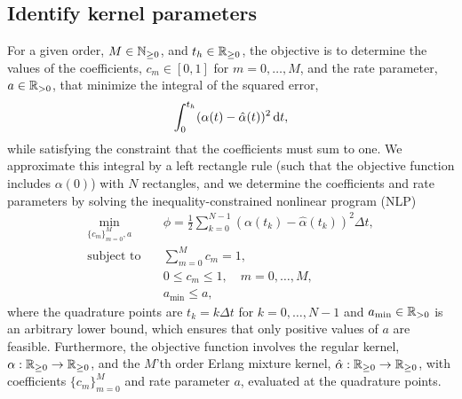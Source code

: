 \subsection{Identify kernel parameters}\label{sec:algo:least:squares}
For a given order, $M \in \mathbb{N}_{\geq 0}$, and $t_h \in \mathbb{R}_{\geq 0}$, the objective is to determine the values of the coefficients, $c_m \in [0, 1]$ for $m = 0, \ldots, M$, and the rate parameter, $a \in \mathbb{R}_{> 0}$, that minimize the integral of the squared error,
%
\begin{align}
	\int_0^{t_h} (\alpha(t) - \hat \alpha(t))^2 \,\mathrm{d} t,
\end{align}
%
while satisfying the constraint that the coefficients must sum to one. We approximate this integral by a left rectangle rule (such that the objective function includes $\alpha(0)$) with $N$ rectangles, and we determine the coefficients and rate parameters by solving the inequality-constrained nonlinear program (NLP)
%
\begin{subequations}\label{eq:algo:nlp}
	\begin{align}
		\label{eq:algo:nlp:obj}
		\min_{\{c_{m}\}_{m=0}^{M}, a} \quad &\phi = \frac{1}{2} \sum_{k=0}^{N-1} (\alpha(t_k) - \hat \alpha(t_k))^2 \Delta t, \\
		\label{eq:algo:nlp:sum}
		\text{subject to} \quad &
		\sum_{m=0}^{M} c_{m} = 1, \\
		\label{eq:algo:nlp:c}
		&0 \leq c_{m} \leq 1, \quad m = 0, \ldots, M, \\
		\label{eq:algo:nlp:a}
		&a_{\min} \leq a,
	\end{align}
\end{subequations}
%
where the quadrature points are $t_k = k \Delta t$ for $k = 0, \ldots, N-1$ and $a_{\min} \in \mathbb{R}_{> 0}$ is an arbitrary lower bound, which ensures that only positive values of $a$ are feasible. Furthermore, the objective function involves the regular kernel, $\alpha: \mathbb{R}_{\geq 0} \rightarrow \mathbb{R}_{\geq 0}$, and the $M$'th order Erlang mixture kernel, $\hat \alpha: \mathbb{R}_{\geq 0} \rightarrow \mathbb{R}_{\geq 0}$, with coefficients $\{c_m\}_{m=0}^M$ and rate parameter $a$, evaluated at the quadrature points.


